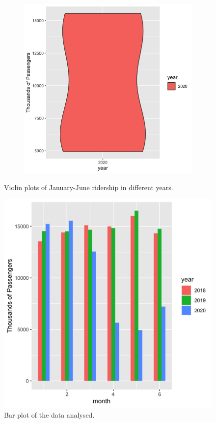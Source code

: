 \documentclass[letterpaper, 10 pt, conference]{article}
\begin{document}
\begin{figure}[h!]
\begin{subfigure}[b]{0.3\linewidth}
		\caption{}
	\end{subfigure}
	\begin{subfigure}[b]{0.3\linewidth}
		\includegraphics[width=\linewidth]{violin_plot_2020.png}
		\caption{}
	\end{subfigure}
	\caption{Violin plots of January-June ridership in different years.}
	\label{fig:violinplots}
\end{figure}

\begin{figure}[th!]
	\centering
	\includegraphics[scale=.1]{bar_plot_2018_to_2020}
	\caption{Bar plot of the data analysed.}
	\label{fig:barplot2018_to_2020}
\end{figure}
\end{document}
